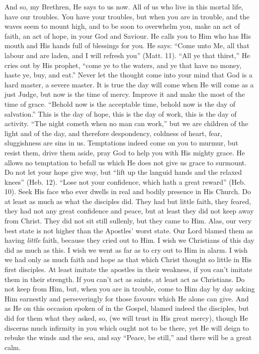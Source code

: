 And so, my Brethren, He says to us now. All of us
who live in this mortal life, have our troubles. You have your
troubles, but when you are in trouble, and the waves seem to mount
high, and to be soon to overwhelm you, make an act of faith, an act of
hope, in your God and Saviour. He calls you to Him who has His
mouth and His hands full of blessings for you. He says: ``Come
unto Me, all that labour and are laden, and I will refresh you'' (Matt.
11). ``All ye that thirst,'' He cries out by His prophet,
``come ye to the waters, and ye that have no money, haste ye, buy,
and eat.'' Never let the thought come into your mind that God is a hard
master, a severe master. It is true the day will come when He will
come as a just Judge, but now is the time of mercy. Improve it and
make the most of the time of grace. ``Behold now is the acceptable
time, behold now is the day of salvation.'' This is the day of hope,
this is the day of work, this is the day of activity. ``The night
cometh when no man can work,'' but we are children of the light and of
the day, and therefore despondency, coldness of heart, fear,
sluggishness are sins in us. Temptations indeed come on you to murmur,
but resist them, drive them aside, pray God to help you with His
mighty grace. He allows no temptation to befall us which He does not
give us grace to surmount. Do not let your hope give way, but
``lift up the languid hands and the relaxed knees'' (Heb. 12).
``Lose not your confidence, which hath a great reward'' (Heb. 10).
Seek His face who ever dwells in real and bodily presence in His
Church. Do at least as much as what the disciples did. They had but
little faith, they feared, they had not any great confidence and
peace, but at least they did not keep away from Christ. They did
not sit still sullenly, but they came to Him. Alas, our very best
state is not higher than the Apostles' worst state. Our Lord blamed
them as having \emph{little} faith, because they cried out to Him. I
wish we Christians of this day did as much as this. I wish we went as
far as to cry out to Him in alarm. I wish we had only as much faith
and hope as that which Christ thought so little in His first
disciples. At least imitate the apostles in their weakness, if you can't
imitate them in their strength. If you can't act as saints, at least
act as Christians. Do not keep from Him, but, when you are in trouble,
come to Him day by day asking Him earnestly and perseveringly for
those favours which He alone can give. And as He on this occasion
spoken of in the Gospel, blamed indeed the disciples, but did for them
what they asked, so, (we will trust in His great mercy), though He
discerns much infirmity in you which ought not to be there, yet He
will deign to rebuke the winds and the sea, and say ``Peace, be
still,'' and there will be a great calm.

